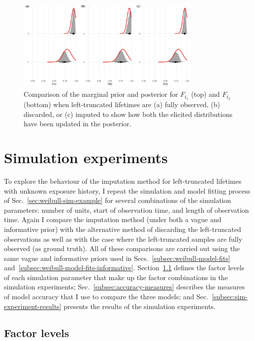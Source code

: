 \begin{figure}[t]
    \centering
    \includegraphics[width=0.8\textwidth]{./figures/ch-2/prior-post-comp.pdf}
    \caption{Comparison of the marginal prior and posterior for $F_{t_1}$ (top) and $F_{t_2}$ (bottom) when left-truncated lifetimes are (a) fully observed, (b) discarded, or (c) imputed to show how both the elicited distributions have been updated in the posterior.}
    \label{fig:weibull-prior-post-comp}
\end{figure}

\section{Simulation experiments} \label{sec:weibull-sim-study}

To explore the behaviour of the imputation method for left-truncated lifetimes with unknown exposure history, I repeat the simulation and model fitting process of Sec.~\ref{sec:weibull-sim-example} for several combinations of the simulation parameters: number of units, start of observation time, and length of observation time. Again I compare the imputation method (under both a vague and informative prior) with the alternative method of discarding the left-truncated observations as well as with the case where the left-truncated samples are fully observed (as ground truth). All of these comparisons are carried out using the same vague and informative priors used in Secs.~\ref{subsec:weibull-model-fits} and~\ref{subsec:weibull-model-fits-informative}. Section~\ref{subsec:factor-lvls} defines the factor levels of each simulation parameter that make up the factor combinations in the simulation experiments; Sec.~\ref{subsec:accuracy-measures} describes the measures of model accuracy that I use to compare the three models; and Sec.~\ref{subsec:sim-experiment-results} presents the results of the simulation experiments.

\subsection{Factor levels} \label{subsec:factor-lvls}

